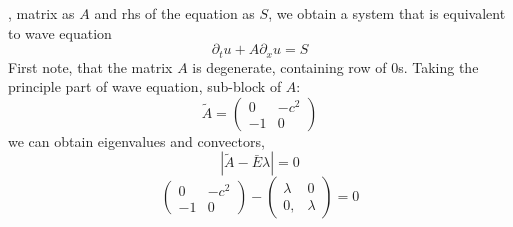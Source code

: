 \documentclass{article}
\begin{document}
, matrix as $A$ and rhs of the equation as $S$, we obtain a system that is equivalent to wave equation
\begin{equation}
	\partial_t u + A\partial_x u = S
\end{equation}
%
First note, that the matrix $A$ is degenerate, containing row of $0$s. Taking the principle part of wave equation, sub-block of $A$:
\begin{equation}
	\tilde{A} =
	\begin{pmatrix}
	0 & -c^2 \\
	-1 & 0
	\end{pmatrix}
\end{equation}
we can obtain eigenvalues and convectors, 
\begin{equation}
	|\tilde{A} - \bar{E}\lambda| = 0
\end{equation}
%
\begin{equation}
	\begin{pmatrix}
	0 & -c^2 \\
	-1 & 0
	\end{pmatrix}
	-
	\begin{pmatrix}
	\lambda & 0 \\
	0, & \lambda
	\end{pmatrix}
	= 0
\end{equation}
\end{document}
